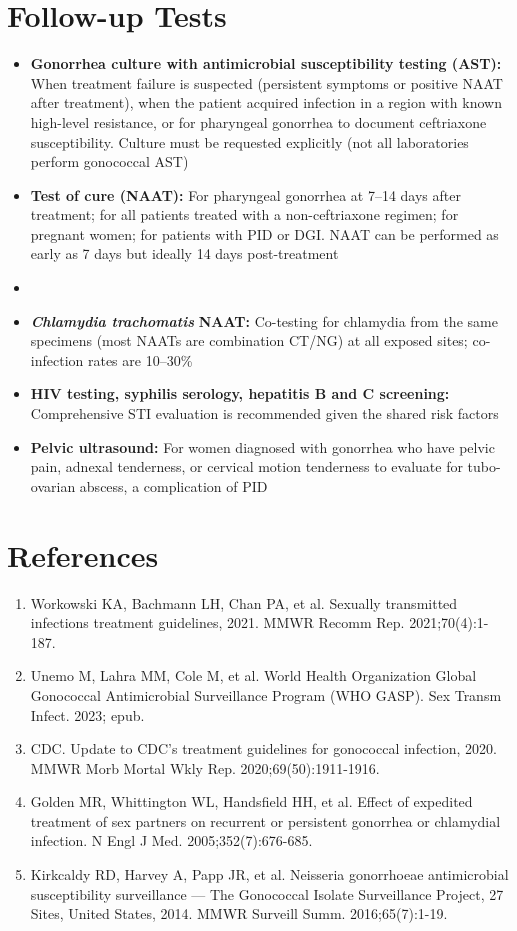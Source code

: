 \section*{Follow-up Tests}
\begin{itemize}
  \item \textbf{Gonorrhea culture with antimicrobial susceptibility testing (AST):} When treatment failure is suspected (persistent symptoms or positive NAAT after treatment), when the patient acquired infection in a region with known high-level resistance, or for pharyngeal gonorrhea to document ceftriaxone susceptibility. Culture must be requested explicitly (not all laboratories perform gonococcal AST)
  \item \textbf{Test of cure (NAAT):} For pharyngeal gonorrhea at 7--14 days after treatment; for all patients treated with a non-ceftriaxone regimen; for pregnant women; for patients with PID or DGI. NAAT can be performed as early as 7 days but ideally 14 days post-treatment
  \item \item \textit{\textbf{Chlamydia trachomatis}} \textbf{NAAT:} Co-testing for chlamydia from the same specimens (most NAATs are combination CT/NG) at all exposed sites; co-infection rates are 10--30\%
  \item \textbf{HIV testing, syphilis serology, hepatitis B and C screening:} Comprehensive STI evaluation is recommended given the shared risk factors
  \item \textbf{Pelvic ultrasound:} For women diagnosed with gonorrhea who have pelvic pain, adnexal tenderness, or cervical motion tenderness to evaluate for tubo-ovarian abscess, a complication of PID
\end{itemize}

\section*{References}
\begin{enumerate}
  \item Workowski KA, Bachmann LH, Chan PA, et al. Sexually transmitted infections treatment guidelines, 2021. MMWR Recomm Rep. 2021;70(4):1-187.
  \item Unemo M, Lahra MM, Cole M, et al. World Health Organization Global Gonococcal Antimicrobial Surveillance Program (WHO GASP). Sex Transm Infect. 2023; epub.
  \item CDC. Update to CDC's treatment guidelines for gonococcal infection, 2020. MMWR Morb Mortal Wkly Rep. 2020;69(50):1911-1916.
  \item Golden MR, Whittington WL, Handsfield HH, et al. Effect of expedited treatment of sex partners on recurrent or persistent gonorrhea or chlamydial infection. N Engl J Med. 2005;352(7):676-685.
  \item Kirkcaldy RD, Harvey A, Papp JR, et al. Neisseria gonorrhoeae antimicrobial susceptibility surveillance --- The Gonococcal Isolate Surveillance Project, 27 Sites, United States, 2014. MMWR Surveill Summ. 2016;65(7):1-19.
\end{enumerate}

\clearpage
